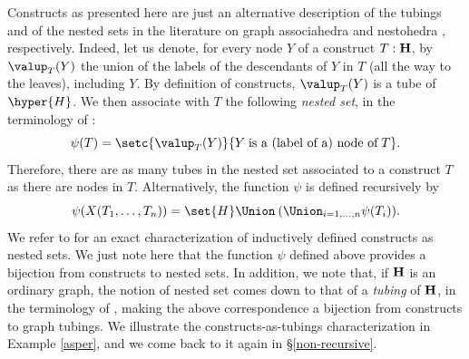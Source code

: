 \begin{remark}\label{tub}
Constructs as presented here are  just an alternative description of the tubings and of the nested sets  in the literature on graph associahedra \cite{CD-CCGA} and nestohedra \cite{P09}, respectively. Indeed, let us denote, for every node $Y$ of a construct  $T:{\bf H}$, by $\valup_T(Y)$   the union of the  labels of the descendants of $Y$ in $T$ (all the way to the leaves), including $Y$. 
  By definition of constructs, $\valup_T(Y)$ is a tube of $\hyper{H}$.  We then associate with $T$ the following  {\em nested set}, in the terminology of \cite{P09}:
$$\psi(T)= \setc{\valup_T(Y)}{Y\;\mbox{is a (label of a) node of}\;T}.$$ Therefore, there are  as many tubes in the nested set associated to a construct $T$ as there are nodes in $T$. 
Alternatively, the function $\psi$ is defined recursively by
$$\psi(X(T_1,\ldots,T_n))= \set{H}\Union\: (\Union_{i=1,\ldots,n} \psi(T_i)).$$
We refer to \cite[Proposition 2]{COI} for an exact characterization of inductively defined constructs as nested sets. We just note here that the function $\psi$ defined above provides a bijection from constructs to nested sets. In addition, we note that, if ${\bf H}$ is an ordinary graph, the notion of nested set comes down to that of a {\em tubing} of ${\bf H}$, in the terminology of \cite{CD-CCGA}, making the above   correspondence   a bijection from constructs to graph tubings.
  We illustrate the constructs-as-tubings characterization in Example \ref{asper}, and we come back to it again in   \S\ref{non-recursive}.
\end{remark}

